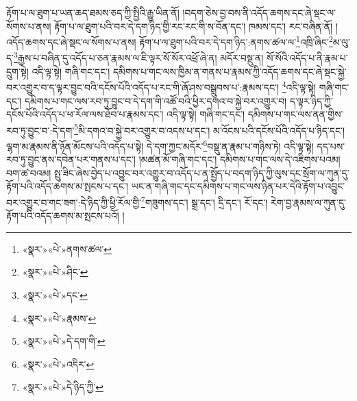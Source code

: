 རྟོག་པ་ལ་ཐུག་པ་ཡན་ཆད་ཐམས་ཅད་ཀྱི་སྤྱིའི་རྒྱུ་ཡིན་ནོ། །བདག་ཅེས་བྱ་བས་ནི་འདོད་ཆགས་དང་ཞེ་སྡང་ལ་སོགས་པ་ནས། རྟོག་པ་ལ་ཐུག་པའི་བར་དེ་དག་ཉིད་གྱི་རང་རང་གི་ས་བོན་དང་། ཁམས་དང་། རང་བཞིན་ནོ། །འདོད་ཆགས་དང་ཞེ་སྡང་ལ་སོགས་པ་ནས། རྟོག་པ་ལ་ཐུག་པའི་བར་དེ་དག་ཉིད་:ནགས་ཚལ་ལ་\footnote{«སྣར་»«པེ་»ནགས་ཚལ་}འཁྲི་ཞིང་\footnote{«སྣར་»«པེ་»ཤིང་}མ་ལུ་ད་\footnote{«སྣར་»«པེ་»དང་}རྒྱས་པ་བཞིན་དུ་འདོད་པ་ཅན་རྣམས་ལ་ཇི་ལྟར་སོ་སོར་འཕྲོ་ཞེ་ན། མདོར་བསྡུ་ན། སོ་སོའི་འདོད་པ་ནི་རྣམ་པ་དྲུག་སྟེ། འདི་ལྟ་སྟེ། གཞི་གང་དང་། དམིགས་པ་གང་ལས་ཁྱིམ་ན་གནས་པ་རྣམས་ཀྱི་འདོད་ཆགས་དང་ཞེ་སྡང་སྐྱེ་བར་འགྱུར་བ་ད་ལྟར་བྱུང་བའི་དངོས་པོའི་འདོད་པ་རང་གི་ཞོ་ཤས་བསྒྲུབས་པ་:རྣམས་དང་། \footnote{«སྣར་»«པེ་»རྣམས་}འདི་ལྟ་སྟེ། གཞི་གང་དང་། དམིགས་པ་གང་ལས་རབ་ཏུ་བྱུང་བ་དེ་དག་གི་འཚོ་བའི་ཕྱིར་དགའ་བ་སྐྱེ་བར་འགྱུར་བ། ད་ལྟར་ཉིད་ཀྱི་དངོས་པོའི་འདོད་པ་ཕ་རོལ་ལས་ཐོབ་པ་རྣམས་དང་། འདི་ལྟ་སྟེ། གཞི་གང་དང་། དམིགས་པ་གང་ལས་ནན་གྱིས་རབ་ཏུ་བྱུང་བ་:དེ་དག་\footnote{«སྣར་»«པེ་»དེ་དག་གི་}མི་དགའ་བ་སྐྱེ་བར་འགྱུར་བ་འདས་པ་དང་། མ་འོངས་པའི་དངོས་པོའི་འདོད་པ་ཉིད་དང་། ལྷག་མ་རྣམས་ནི་ཉོན་མོངས་པའི་འདོད་པ་སྟེ། དེ་དག་ཀྱང་མདོར་\footnote{«སྣར་»«པེ་»འདིར་}བསྡུ་ན་རྣམ་པ་གཉིས་ཏེ། འདི་ལྟ་སྟེ། དད་པས་རབ་ཏུ་བྱུང་ནས་དབེན་པར་གནས་པ་དང་། །མཚན་མོ་གཞི་གང་དང་། དམིགས་པ་གང་ལས་དེ་འཇིགས་པའམ། བག་ཚ་བའམ། སྤུ་ཟིང་ཞེས་བྱེད་པ་འབྱུང་བར་འགྱུར་བ་འདོད་པ་ན་སྤྱོད་པ་བདག་ཉིད་ཀྱི་ལུས་དང་སྲོག་ལ་ཀུན་དུ་རྟོག་པའི་འདོད་ཆགས་མ་སྤངས་པ་དང་། ཡང་ན་གཞི་གང་དང་དམིགས་པ་གང་ལས་ཉིན་པར་དེའི་རྟོག་པ་འབྱུང་བར་འགྱུར་བ་གང་ཟག་:དེ་ཉིད་ཀྱི་ཕྱི་རོལ་གྱི་\footnote{«སྣར་»«པེ་»དེ་ཉིད་ཀྱི་}གཟུགས་དང་། སྒྲ་དང་། དྲི་དང་། རོ་དང་། རེག་བྱ་རྣམས་ལ་ཀུན་དུ་རྟོག་པའི་འདོད་ཆགས་མ་སྤངས་པའོ། །
